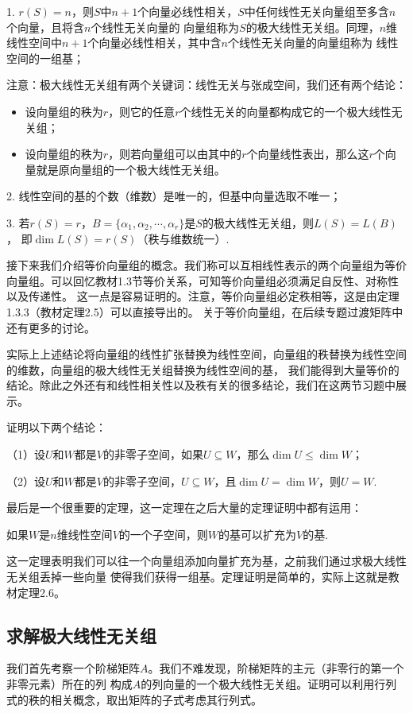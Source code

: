 1. $r(S)=n$，则$S$中$n+1$个向量必线性相关，$S$中任何线性无关向量组至多含$n$个向量，且将含$n$个线性无关向量的
向量组称为$S$的极大线性无关组。同理，$n$维线性空间中$n+1$个向量必线性相关，其中含$n$个线性无关向量的向量组称为
线性空间的一组基；

注意：极大线性无关组有两个关键词：线性无关与张成空间，我们还有两个结论：
\begin{itemize}
	\item 设向量组的秩为$r$，则它的任意$r$个线性无关的向量都构成它的一个极大线性无关组；
	\item 设向量组的秩为$r$，则若向量组可以由其中的$r$个向量线性表出，那么这$r$个向量就是原向量组的一个极大线性无关组。
\end{itemize}

2. 线性空间的基的个数（维数）是唯一的，但基中向量选取不唯一；

3. 若$r(S)=r$，$B=\{\alpha_1,\alpha_2,\cdots,\alpha_r\}$是$S$的极大线性无关组，则$L(S)=L(B)$，
即$\dim L(S)=r(S)$（秩与维数统一）.

接下来我们介绍等价向量组的概念。我们称可以互相线性表示的两个向量组为等价向量组。可以回忆教材1.3节等价关系，可知等价向量组必须满足自反性、对称性以及传递性。
这一点是容易证明的。注意，等价向量组必定秩相等，这是由定理1.3.3（教材定理2.5）可以直接导出的。
关于等价向量组，在后续专题过渡矩阵中还有更多的讨论。

实际上上述结论将向量组的线性扩张替换为线性空间，向量组的秩替换为线性空间的维数，向量组的极大线性无关组替换为线性空间的基，
我们能得到大量等价的结论。除此之外还有和线性相关性以及秩有关的很多结论，我们在这两节习题中展示。
\begin{example}
	证明以下两个结论：

	\textup{（1）}设$U$和$W$都是$V$的非零子空间，如果$U\subseteq W$，那么$\dim U \le \dim W$；
	
	\textup{（2）}设$U$和$W$都是$V$的非零子空间，$U\subseteq W$，且$\dim U = \dim W$，则$U = W$.
\end{example}
最后是一个很重要的定理，这一定理在之后大量的定理证明中都有运用：
\begin{theorem}
	如果$W$是$n$维线性空间$V$的一个子空间，则$W$的基可以扩充为$V$的基.
\end{theorem}
这一定理表明我们可以往一个向量组添加向量扩充为基，之前我们通过求极大线性无关组丢掉一些向量
使得我们获得一组基。定理证明是简单的，实际上这就是教材定理2.6。
\subsection{求解极大线性无关组}
我们首先考察一个阶梯矩阵$A$。我们不难发现，阶梯矩阵的主元（非零行的第一个非零元素）所在的列
构成$A$的列向量的一个极大线性无关组。证明可以利用行列式的秩的相关概念，取出矩阵的子式考虑其行列式。

